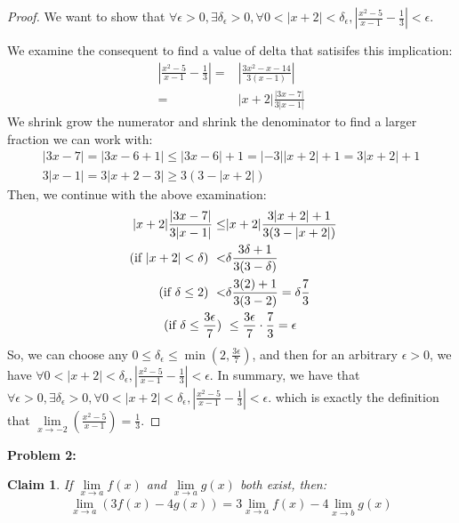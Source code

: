 \documentclass{article}
\newcommand{\eps}{\ensuremath{\epsilon}}
\newcommand{\limx}[2]{\ensuremath{\underset{x\to #2 }{\lim} #1 (x)}}
\newtheorem{clm}{Claim}
\begin{document}
\begin{proof}
	We want to show that
	$\forall \eps > 0, \exists \delta_\eps > 0,
	\forall 0 < |x + 2| < \delta_\eps, |\frac{x^2-5}{x-1} - \frac{1}{3}| < \eps$.

	We examine the consequent to find a value of delta
	that satisifes this implication:
	\begin{align}
		|\frac{x^2-5}{x-1} - \frac{1}{3}| = & | \frac{3x^2 - x - 14}{3(x-1)}| \\
		= & |x+2| \frac{|3x-7|}{3|x - 1|}
	\end{align}
	We shrink grow the numerator and shrink the denominator to find a larger fraction we can work with:
	\begin{align}
		|3x-7| = |3x -6 + 1| \le |3x - 6| + 1 = |-3||x + 2| + 1 = 3|x + 2| + 1 \\
		3|x - 1| = 3|x + 2 - 3| \geq 3(3 - |x + 2|)
	\end{align}
	Then, we continue with the above examination:
	\begin{align}
		|x+2| \frac{|3x-7|}{3|x - 1|} \le & |x + 2| \frac{3|x+2| + 1}{3(3 - |x + 2|)} \\
		\textrm{ (if $ |x + 2| < \delta$) } < & \delta\frac{3\delta+1}{3(3 - \delta)} \\
		\textrm{ (if $\delta \le 2$) } < & \delta\frac{3(2)+1}{3(3 - 2)} = \delta\frac{7}{3} \\
		\textrm{ (if $\delta \le \frac{3 \eps}{7}$) } & \le \frac{3\eps}{7} \cdot \frac{7}{3} = \eps
	\end{align}
	So, we can choose any $0 \le \delta_\eps \le \min(2, \frac{3\eps}{7})$,
	and then for an arbitrary $\eps > 0$,
	we have 
	$\forall 0 < |x + 2| < \delta_\eps, |\frac{x^2-5}{x-1} - \frac{1}{3}| < \eps$.
	In summary,
	we have that
	$\forall \eps > 0,
	\exists \delta_\eps > 0,
	\forall 0 < |x + 2| < \delta_\eps, |\frac{x^2-5}{x-1} - \frac{1}{3}| < \eps$.
	which is exactly the definition that 
	$\underset{x\to -2}{\lim} (\frac{x^2 - 5}{x - 1}) = \frac{1}{3}$.
\end{proof}

\textbf{Problem 2:}

\begin{clm}
	If $\limx{f}{a}$ and $\limx{g}{a}$ both exist, then:
	\begin{align}
		\underset{x \to a}{\lim} (3f(x) - 4g(x))  = 3\limx{f}{a} - 4\limx{g}{b}
	\end{align}
\end{clm}
\end{document}
